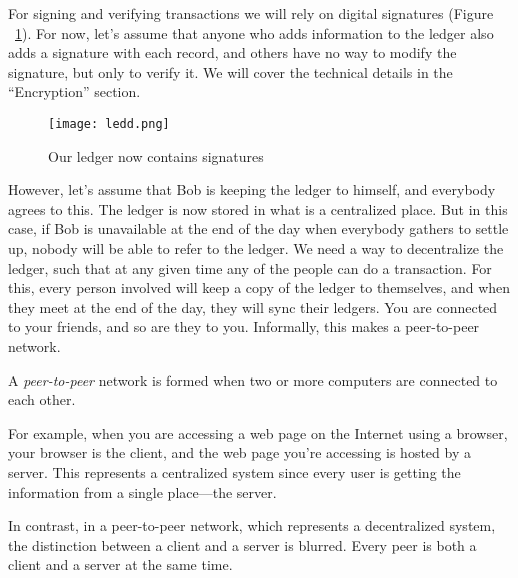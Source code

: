 \documentclass[12pt,a4paper]{report}
\begin{document}
\vspace{0.5em}

For signing and verifying transactions we will rely on digital signatures (Figure ~\ref{fig:ledd}). For now, let’s assume that anyone who adds information to the ledger also adds a signature with each record, and others have no way to modify the signature, but only to verify it. We will cover the technical details in the “Encryption” section.


\begin{figure}[H]
    \centering
    \texttt{[image: ledd.png]}
    \caption{Our ledger now contains signatures}
    \label{fig:ledd}
\end{figure}

\vspace{0.5em}

However, let’s assume that Bob is keeping the ledger to himself, and 
everybody agrees to this. The ledger is now stored in what is a centralized 
place. But in this case, if Bob is unavailable at the end of the day when 
everybody gathers to settle up, nobody will be able to refer to the ledger.
We need a way to decentralize the ledger, such that at any given time 
any of the people can do a transaction. For this, every person involved will 
keep a copy of the ledger to themselves, and when they meet at the end of 
the day, they will sync their ledgers.
You are connected to your friends, and so are they to you. Informally, 
this makes a peer-to-peer network.

\vspace{0.5em}

\begin{tcolorbox}[colframe=black!75, colback=white, sharp corners, fonttitle=\bfseries, boxrule=0.5pt, title=\faInfoCircle\ Definition 1-4]
A \textit{peer-to-peer} network is formed when two or more computers are connected to each other.
\end{tcolorbox}

\vspace{0.5em}

For example, when you are accessing a web page on the Internet using 
a browser, your browser is the client, and the web page you’re accessing is 
hosted by a server. This represents a centralized system since every user is 
getting the information from a single place—the server.

In contrast, in a peer-to-peer network, which represents a 
decentralized system, the distinction between a client and a server is 
blurred. Every peer is both a client and a server at the same time.
\end{document}
